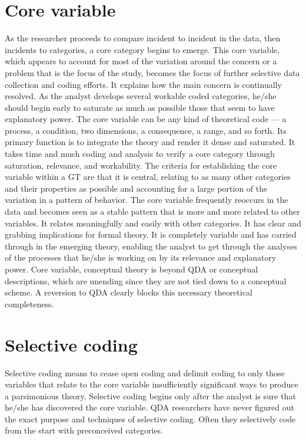 \section*{Core variable}
As the researcher proceeds to compare incident to incident in the data, then incidents to categories, 
a core category begins to emerge. 
This core variable,
which appears to account for most of the variation around the concern or
a problem that is the focus of the study, 
becomes the focus of further selective data collection and coding efforts.
It explains how the main concern is continually resolved. 
As the analyst develops several workable coded categories, he/she should begin early to saturate as much as possible those that seem to have explanatory power. 
The core variable can be any kind of theoretical code --- a process, 
a condition, two dimensions, a consequence, a range, and so forth. 
Its primary function is to integrate the theory and render it dense and saturated. 
It takes time and much coding and analysis to verify a core category through saturation, relevance, and workability. 
The criteria for establishing the core variable within a GT are that it is central, relating to as many other categories and their properties as possible and accounting for a large portion of the variation in a pattern of behavior. 
The core variable frequently reoccurs in the data and becomes seen as a stable pattern that is more and more related to other variables. 
It relates meaningfully and easily with other categories. 
It has clear and grabbing implications for formal theory. 
It is completely variable and has carried through in the emerging theory,
enabling the analyst to get through the analyses of the processes that he/she is working on by its relevance and explanatory power. 
Core variable, 
conceptual theory is beyond QDA or conceptual descriptions, which are unending since they are not tied down to a conceptual scheme. 
A reversion to QDA clearly blocks this necessary theoretical completeness.

\section*{Selective coding}

Selective coding means to cease open coding and delimit coding to only those variables that relate to the core variable insufficiently significant ways to produce a parsimonious theory. 
Selective coding begins only after the analyst is sure that he/she has discovered the core variable. 
QDA researchers have never figured out the exact purpose and techniques of selective coding. 
Often they selectively code from the start with preconceived categories.

